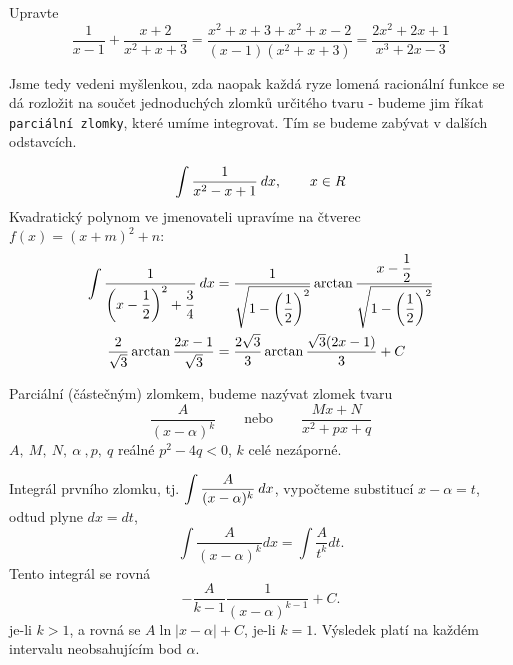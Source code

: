 {      \begin{example}
        Upravte
        \footnotesize\begin{equation*}
          \frac{1}{x-1}+\frac{x+2}{x^2+x+3} 
             = \frac{x^2+x+3+x^2+x-2}{(x-1)(x^2+x+3)}              
             = \frac{2x^2+2x+1}{x^3+2x-3}
        \end{equation*}          
      \end{example}
      
      Jsme tedy vedeni myšlenkou, zda naopak každá ryze lomená racionální funkce se dá rozložit
      na součet jednoduchých zlomků určitého tvaru - budeme jim říkat \texttt{parciální zlomky},
      které umíme integrovat. Tím se budeme zabývat v dalších odstavcích. 
            
      \begin{example}
        \begin{equation}
          \int\frac{1}{x^2 - x + 1}\hspace{2pt}dx, \qquad x\in R
        \end{equation}
        Kvadratický polynom ve jmenovateli upravíme na čtverec $f(x) = (x + m)^2 + n$:
        \begin{align*}
          \int\dfrac{1}{\left(x-\dfrac{1}{2}\right)^2+\dfrac{3}{4}}\hspace{2pt}dx   &=
            \dfrac{1}{\sqrt{1-\left(\dfrac{1}{2}\right)^2}}\arctan
            \dfrac{x-\dfrac{1}{2}}{\sqrt{1-\left(\dfrac{1}{2}\right)^2}}                       \\
          \dfrac{2}{\sqrt{3}}\arctan\dfrac{2x-1}{\sqrt{3}}               &=
            \dfrac{2\sqrt{3}}{3}\arctan\dfrac{\sqrt{3}(2x-1)}{3} + C
        \end{align*}
      \end{example}     
      
      \begin{definition} Parciální (částečným) zlomkem, budeme nazývat zlomek tvaru
         \begin{equation}
            \frac{A}{(x-\alpha)^k} \qquad\text{nebo}\qquad\frac{Mx + N}{x^2 + px +q}
         \end{equation}  
         $A,\ M,\ N,\ \alpha\ , p,\ q$ reálné $p^2-4q < 0$, $k$ celé nezáporné.         
      \end{definition}
      
      Integrál prvního zlomku, tj. $\displaystyle{\int\frac{A}{(x-\alpha)^k}\hspace{2pt}dx}$, vypočteme 
      substitucí $x-\alpha=t$, odtud plyne $dx = dt$,
      \begin{equation}\label{MA:int_ex_14}
        \int\frac{A}{(x-\alpha)^k}dx = \int\frac{A}{t^k}dt.
      \end{equation}
      Tento integrál se rovná
      \begin{equation}\label{MA:int_ex_16}
        -\frac{A}{k-1}\frac{1}{(x-\alpha)^{k-1}} + C.
      \end{equation}        
      je-li $k>1$, a rovná se $A\ln|x-\alpha| + C$, je-li $k = 1$. Výsledek platí na každém
      intervalu neobsahujícím bod $\alpha$.
      
}
